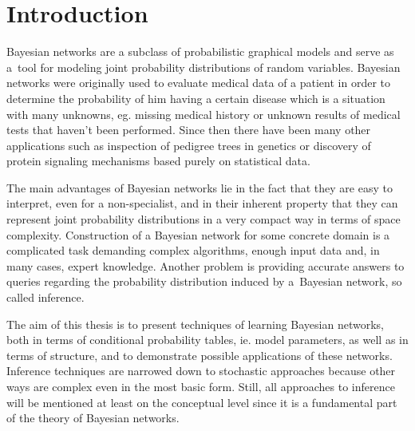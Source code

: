 \documentclass[english,cover]{fitthesis} %
\date{16. května 2013}
\begin{document}
  \maketitle
  \tableofcontents
  


  









\chapter{Introduction}
Bayesian networks are a subclass of probabilistic graphical models and serve as a~tool for modeling joint probability distributions of random variables. Bayesian networks were originally used to evaluate medical data of a patient in order to determine the probability of him having a certain disease which is a situation with many unknowns, eg. missing medical history or unknown results of medical tests that haven't been performed. Since then there have been many other applications such as inspection of pedigree trees in genetics or discovery of protein signaling mechanisms based purely on statistical data.

The main advantages of Bayesian networks lie in the fact that they are easy to interpret, even for a non-specialist, and in their inherent property that they can represent joint probability distributions in a very compact way in terms of space complexity. Construction of a Bayesian network for some concrete domain is a complicated task demanding complex algorithms, enough input data and, in many cases, expert knowledge. Another problem is providing accurate answers to queries regarding the probability distribution induced by a~Bayesian network, so called inference.

The aim of this thesis is to present techniques of learning Bayesian networks, both in terms of conditional probability tables, ie. model parameters, as well as in terms of structure, and to demonstrate possible applications of these networks. Inference techniques are narrowed down to stochastic approaches because other ways are complex even in the most basic form. Still, all approaches to inference will be mentioned at least on the conceptual level since it is a fundamental part of the theory of Bayesian networks.
\end{document}
